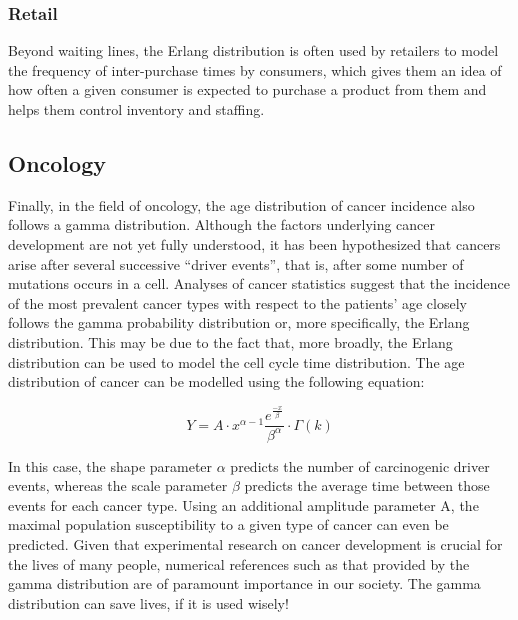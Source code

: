 \documentclass[12pt]{article}
\begin{document}
\subsubsection{Retail}
Beyond waiting lines, the Erlang distribution is often used by retailers to model the frequency of inter-purchase times
by consumers, which gives them an idea of how often a given consumer is expected to purchase a product from them and
helps them control inventory and staffing.

\subsection{Oncology}
Finally, in the field of oncology, the age distribution of cancer incidence also follows a gamma distribution. Although
the factors underlying cancer development are not yet fully understood, it has been hypothesized that cancers arise
after several successive “driver events”, that is, after some number of mutations occurs in a cell. Analyses of cancer
statistics suggest that the incidence of the most prevalent cancer types with respect to the patients' age closely
follows the gamma probability distribution or, more specifically, the Erlang distribution. This may be due to the fact
that, more broadly, the Erlang distribution can be used to model the cell cycle time
distribution\cite{belikovNumberKeyCarcinogenic2017}. The age distribution of cancer can be modelled using the following equation:

\begin{equation}
	Y = A\cdot x^{\alpha-1}\frac{e^{\frac{-x}{\beta}}}{\beta^\alpha}\cdot\Gamma(k)
\end{equation}

In this case, the shape parameter $\alpha$ predicts the number of carcinogenic driver events, whereas the scale
parameter $\beta$ predicts the average time between those events for each cancer type. Using an additional amplitude
parameter A, the maximal population susceptibility to a given type of cancer can even be
predicted\cite{belikovNumberKeyCarcinogenic2017}. Given that experimental research on cancer development is crucial for
the lives of many people, numerical references such as that provided by the gamma distribution are of paramount
importance in our society. The gamma distribution can save lives, if it is used wisely!

\end{document}

